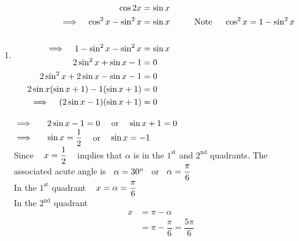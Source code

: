 \documentclass[11pt,a4paper]{article}
\begin{document}
\begin{enumerate}
\item[ii.]
\begin{align*}
\cos 2x & = \sin x\\
\implies \hspace{0.3cm} \cos^2x - \sin^2x & = \sin x\hspace{1cm} \text{Note}\hspace{0.5cm} \cos^2x = 1 - \sin^2x\\\\
\implies \hspace{0.3cm} 1 - \sin^2x - \sin^2x & = \sin x\\
2\sin^2x + \sin x - 1 & = 0\\
2\sin^2x + 2\sin x - \sin x  - 1 & = 0\\
2\sin x ( \sin x + 1) - 1(\sin x + 1) & = 0\\
\implies\hspace{0.3cm} (2\sin x - 1)(\sin x + 1) & = 0
\end{align*}

$\implies\hspace{0.5cm} 2\sin x  - 1 = 0\hspace{0.3cm}$ or $\hspace{0.3cm} \sin x + 1 = 0$\\

$\implies\hspace{0.5cm} \sin x = \dfrac{1}{2}\hspace{0.3cm}$ or $\hspace{0.3cm} \sin x  = -1$\\

Since $\hspace{0.3cm} x = \dfrac{1}{2}\hspace{0.3cm}$ implies that $\alpha$ is in the $1^{\text{st}}$ and $2^{\text{nd}}$ quadrants. The associated acute angle is $\hspace{0.2cm} \alpha = 30^o\hspace{0.2cm}$ or $\hspace{0.2cm} \alpha = \dfrac{\pi}{6}$\\

In the $1^{\text{st}}$ quadrant $\hspace{0.3cm} x = \alpha = \dfrac{\pi}{6}$\\

In the $2^{\text{nd}}$ quadrant
\begin{align*}
x & = \pi - \alpha\\
& = \pi - \dfrac{\pi}{6} = \dfrac{5\pi}{6}\\
\end{align*}


\end{enumerate}
\end{document}
